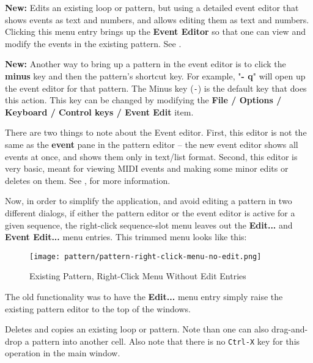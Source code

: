    \textbf{New:}
   Edits an existing loop or pattern, but using a detailed event editor that
   shows events as text and numbers, and allows editing them as text and
   numbers.
   Clicking this menu entry brings up the \textbf{Event Editor}
   so that one can view and modify the events in the existing pattern.
   See .

   \textbf{New:}
   Another way to bring up a pattern in the event editor is to
   click the \textbf{minus} key and then the pattern's shortcut key.
   For example, "\textbf{- q}" will open up the event editor for that pattern.
   The Minus key (\texttt{-}) is the default key that does this action.
   This key can be changed by modifying the
   \textbf{File / Options / Keyboard / Control keys / Event Edit} item.

   There are two things to note about the Event editor.
   First, this editor is not the same as the \textbf{event} pane in the pattern
   editor -- the new event editor shows all events at once, and shows them only
   in text/list format.  Second, this editor is very basic, meant for viewing
   MIDI events and making some minor edits or deletes on them.
   See , for more information.

   Now, in order to simplify the application, and avoid editing a pattern in
   two different dialogs, if either the pattern editor or the event editor is
   active for a given sequence, the right-click sequence-slot menu leaves out
   the \textbf{Edit...} and \textbf{Event Edit...} menu entries.
   This trimmed menu looks like this:

\begin{figure}[H]
   \centering 
   \texttt{[image: pattern/pattern-right-click-menu-no-edit.png]}
   \caption{Existing Pattern, Right-Click Menu Without Edit Entries}
   \label{fig:pattern_window_right_click_no_edit}
\end{figure}

   The old functionality was to have the \textbf{Edit...} menu entry simply
   raise the existing pattern editor to the top of the windows.

   Deletes and copies an existing loop or pattern.
   Note than one can also drag-and-drop a pattern into another cell.
   Also note that there is no \texttt{Ctrl-X} key for this operation in the
   main window.

